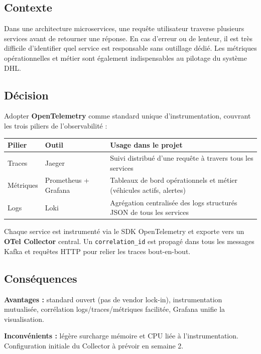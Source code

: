 \documentclass[10pt,a4paper]{article}
\begin{document}
\subsection{Contexte}
Dans une architecture microservices, une requête utilisateur traverse plusieurs services avant de retourner une réponse. En cas d'erreur ou de lenteur, il est très difficile d'identifier quel service est responsable sans outillage dédié. Les métriques opérationnelles et métier sont également indispensables au pilotage du système DHL.

\subsection{Décision}
Adopter \textbf{OpenTelemetry} comme standard unique d'instrumentation, couvrant les trois piliers de l'observabilité :

\vspace{4pt}
\begin{tabularx}{\linewidth}{llX}
  \toprule
  \small\textbf{Pilier} & \small\textbf{Outil} & \small\textbf{Usage dans le projet} \\
  \midrule
  Traces    & Jaeger              & Suivi distribué d'une requête à travers tous les services \\
  Métriques & Prometheus + Grafana & Tableaux de bord opérationnels et métier (véhicules actifs, alertes) \\
  Logs      & Loki                & Agrégation centralisée des logs structurés JSON de tous les services \\
  \bottomrule
\end{tabularx}

\vspace{4pt}
Chaque service est instrumenté via le SDK OpenTelemetry et exporte vers un \textbf{OTel Collector} central. Un \texttt{correlation\_id} est propagé dans tous les messages Kafka et requêtes HTTP pour relier les traces bout-en-bout.

\subsection{Conséquences}
\textbf{Avantages :} standard ouvert (pas de vendor lock-in), instrumentation mutualisée, corrélation logs/traces/métriques facilitée, Grafana unifie la visualisation.

\noindent\textbf{Inconvénients :} légère surcharge mémoire et CPU liée à l'instrumentation. Configuration initiale du Collector à prévoir en semaine 2.
\end{document}
